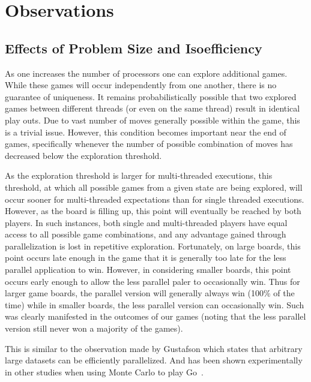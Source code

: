 \documentclass[nocopyrightspace, 10pt]{sigplanconf}
\begin{document}
\section{Observations}

\subsection{Effects of Problem Size and Isoefficiency}

As one increases the number of processors one can explore additional games.  While these games will occur independently from one another, there is no guarantee of uniqueness.  It remains probabilistically possible that two explored games between different threads (or even on the same thread) result in identical play outs.  Due to vast number of moves generally possible within the game, this is a trivial issue.  However, this condition becomes important near the end of games, specifically whenever the number of possible combination of moves has decreased below the exploration threshold. 

As the exploration threshold is larger for multi-threaded executions, this threshold, at which all possible games from a given state are being explored, will occur sooner for multi-threaded expectations than for single threaded executions.  However, as the board is filling up, this point will eventually be reached by both players.  In such instances, both single and multi-threaded players have equal access to all possible game combinations, and any advantage gained through parallelization is lost in repetitive exploration.  Fortunately, on large boards, this point occurs late enough in the game that it is generally too late for the less parallel application to win.  However, in considering smaller boards, this point occurs early enough to allow the less parallel paler to occasionally win.  Thus for larger game boards, the parallel version will generally always win (100\% of the time) while in smaller boards, the less parallel version can occasionally win.  Such was clearly manifested in the outcomes of our games (noting that the less parallel version still never won a majority of the games).


This is similar to the observation made by Gustafson which states that arbitrary large datasets can be efficiently parallelized. And has been shown experimentally in other studies when using Monte Carlo to play Go~\cite{DBLP:journals/corr/MirsoleimaniPVH14,SCAI11}.
\end{document}
